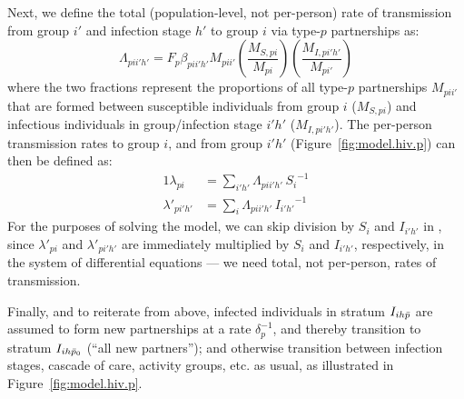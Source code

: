 Next, we define the total (population-level, not per-person) rate of transmission
from group $i'$ and infection stage $h'$ to group $i$ via type-$p$ partnerships as:
\begin{equation}
  \Lambda_{pii'h'} = F_p \beta_{pii'h'} M_{pii'}
  \left(\frac{M_{S,pi}}{M_{pi}}\right)
  \left(\frac{M_{I,pi'h'}}{M_{pi'}}\right)
\end{equation}
where the two fractions represent the proportions of all type-$p$ partnerships $M_{pii'}$
that are formed between susceptible individuals from group $i$ ($M_{S,pi}$)
and infectious individuals in group/infection stage $i'h'$ ($M_{I,pi'h'}$).
The per-person transmission rates to group $i$, and from group $i'h'$
(Figure~\ref{fig:model.hiv.p}) can then be defined as:
\begin{alignat}{1}
  \lambda_{pi} &= \sum_{i'h'} \Lambda_{pii'h'}\,{S_{i}}^{-1} \label{eq:foi.i} \\
  \lambda'_{pi'h'} &= \sum_{i} \Lambda_{pii'h'}\,{I_{i'h'}}^{-1} \label{eq:foi.jh}
\end{alignat}
For the purposes of solving the model,
we can skip division by $S_{i}$ and $I_{i'h'}$ in ,
since $\lambda'_{pi}$ and $\lambda'_{pi'h'}$ are immediately multiplied by $S_{i}$ and $I_{i'h'}$,
respectively, in the system of differential equations
--- \ie we need total, not per-person, rates of transmission.
\par
Finally, and to reiterate from above, infected individuals in stratum $I_{ih\bar{p}}$
are assumed to form new partnerships at a rate $\delta_p^{-1}$,
and thereby transition to stratum $I_{ih\bar{p}_0}$ (``all new partners''); and
otherwise transition between infection stages, cascade of care, activity groups, etc. as usual,
as illustrated in Figure~\ref{fig:model.hiv.p}.
